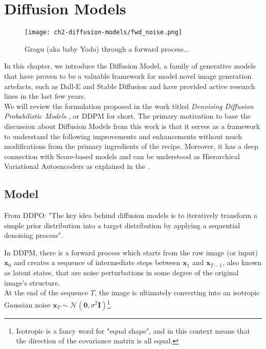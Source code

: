 \chapter{Diffusion Models}

\begin{figure}[ht]
    \centering
    \texttt{[image: ch2-diffusion-models/fwd\_noise.png]}
    \captionsetup{width=\textwidth} %
    \caption{{Grogu (aka baby Yoda) through a forward process...}}
    \label{fig:fwd-process-grogu}
\end{figure}
  
In this chapter, we introduce the Diffusion Model, a family of generative models that have proven to be a valuable framework for model novel image generation artefacts, such as Dall-E and Stable Diffusion and have provided active research lines in the last few years.\\

We will review the formulation proposed in the work titled \textit{Denoising Diffusion Probabilistic Models} \cite{ho2020denoising}, or DDPM for short. The primary motivation to base the discussion about Diffusion Models from this work is that it serves as a framework to understand the following improvements and enhancements without much modifications from the primary ingredients of the recipe. Moreover, it has a deep connection with Score-based models \cite{song2020denoising} and can be understood as Hierarchical Variational Autoencoders as explained in the \cite{luo2022understanding}.\\

\section{Model}

From DDPO: "The key idea behind diffusion models is to iteratively transform a simple prior distribution into a target distribution by applying a sequential denoising process".

In DDPM, there is a forward process which starts from the raw image (or input) $\mathbf{x}_{0}$ and creates a sequence
of intermediate steps between $\mathbf{x}_{1}$ and $\mathbf{x}_{T-1}$, also known as latent states, that are noise perturbations in some degree of the original image's structure.\\ 

At the end of the sequence $T$, the image is ultimately converting into an isotropic Gaussian noise $\mathbf{x}_{T}\sim \mathcal{N}(\mathbf{0}, \sigma^2\mathbf{I})$\footnote{Isotropic is a fancy word for "equal shape", and in this context means that the direction of the covariance matrix is all equal.}.\\

